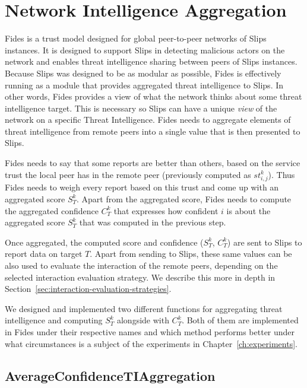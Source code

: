 \section{Network Intelligence Aggregation}
\label{sec:network-intelligence-aggregation}
Fides is a trust model designed for global peer-to-peer networks of Slips instances.
It is designed to support Slips in detecting malicious actors on the network and enables threat intelligence sharing between peers of Slips instances.
Because Slips was designed to be as modular as possible, Fides is effectively running as a module that provides aggregated threat intelligence to Slips. 
In other words, Fides provides a view of what the network thinks about some threat intelligence target. This is necessary so Slips can have a unique \textit{view} of the network on a specific Threat Intelligence.
Fides needs to aggregate elements of threat intelligence from remote peers into a single value that is then presented to Slips.

Fides needs to say that some reports are better than others, based on the service trust the local peer has in the remote peer (previously computed as $st^{k}_{i, j}$).
Thus Fides needs to weigh every report based on this trust and come up with an aggregated score $S^{k}_{T}$.
Apart from the aggregated score, Fides needs to compute the aggregated confidence $C^{k}_{T}$ that expresses how confident $i$ is about the aggregated score $S^{k}_{T}$ that was computed in the previous step.

Once aggregated, the computed score and confidence ($S^{k}_{T}$, $C^{k}_{T}$) are sent to Slips to report data on target $T$.
Apart from sending to Slips, these same values can be also used to evaluate the interaction of the remote peers, depending on the selected interaction evaluation strategy. We describe this more in depth in Section~\ref{sec:interaction-evaluation-strategies}.

We designed and implemented two different functions for aggregating threat intelligence and computing $S^{k}_{T}$ alongside with $C^{k}_{T}$.
Both of them are implemented in Fides under their respective names and which method performs better under what circumstances is a subject of the experiments in Chapter~\ref{ch:experiments}.

\subsection{AverageConfidenceTIAggregation}
\label{subsec:AverageConfidenceTIAggregation}

